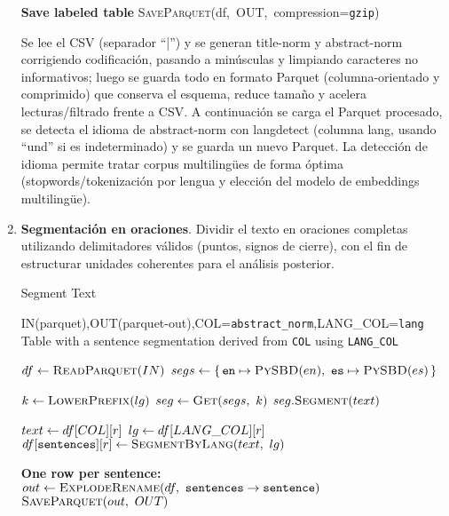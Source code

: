 \begin{enumerate}
\begin{algorithmEN}
\begin{algorithmic}[1]
\Statex \textbf{Save labeled table}
\State \textsc{SaveParquet}(df,\ OUT,\ compression=\texttt{gzip})
\end{algorithmic}
\label{alg:process-and-label}
\end{algorithmEN}

Se lee el CSV (separador “|”) y se generan title-norm y abstract-norm corrigiendo codificación, pasando a 
minúsculas y limpiando caracteres no informativos; luego se guarda todo en formato Parquet (columna-orientado y 
comprimido) que conserva el esquema, reduce tamaño y acelera lecturas/filtrado frente a CSV. A continuación se 
carga el Parquet procesado, se detecta el idioma de abstract-norm con langdetect (columna lang, usando “und” si
es indeterminado) y se guarda un nuevo Parquet. La detección de idioma permite tratar corpus multilingües de forma óptima (stopwords/tokenización por lengua y elección del modelo de embeddings multilingüe).

 \item \textbf{Segmentación en oraciones}. Dividir el texto en oraciones completas utilizando delimitadores válidos (puntos, signos de cierre), con el fin de 
    estructurar unidades coherentes para el análisis posterior. 
\begin{algorithmEN}
\caption{Segment Text }
\begin{algorithmic}[1]
\Require IN(parquet),OUT(parquet-out),COL=\texttt{abstract\_norm},LANG\_COL=\texttt{lang}
\Ensure  Table with a sentence segmentation derived from \texttt{COL} using \texttt{LANG\_COL}

\State $df \leftarrow \textsc{ReadParquet}(IN)$ 
\State $segs \leftarrow \{\,\texttt{en}\mapsto \textsc{PySBD}(en),\ \texttt{es}\mapsto \textsc{PySBD}(es)\,\}$ 

  \State $k \leftarrow \textsc{LowerPrefix}(lg)$ 
  \State $seg \leftarrow \textsc{Get}(segs,\ k)$
  \State \Return $seg.\textsc{Segment}(text)$
\EndFunction

 
  \State $text \leftarrow df[COL][r]$
  \State $lg \leftarrow df[LANG\_COL][r]$
  \State $df[\texttt{sentences}][r] \leftarrow \textsc{SegmentByLang}(text,\ lg)$ 
\EndFor

\Statex \textbf{One row per sentence:}
\State $out \Assign \textsc{ExplodeRename}(df,\ \texttt{sentences}\rightarrow\texttt{sentence})$
\State $\textsc{SaveParquet}(out,\ OUT)$
\end{algorithmic}
\label{alg:segment-text-lang-aware}
\end{algorithmEN}


\end{enumerate}
